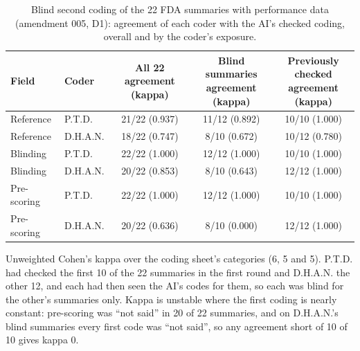 \begin{table}[h!]
\centering
\footnotesize
\caption{Blind second coding of the 22 FDA summaries with performance data (amendment 005, D1): agreement of each coder with the AI's checked coding, overall and by the coder's exposure.}
\label{tab:s-d1}
\begin{adjustbox}{max width=\linewidth}
\begin{tabular}{llccc}
\toprule
Field & Coder & \makecell{All 22\\agreement (kappa)} & \makecell{Blind summaries\\agreement (kappa)} & \makecell{Previously checked\\agreement (kappa)} \\
\midrule
Reference & P.T.D. & 21/22 (0.937) & 11/12 (0.892) & 10/10 (1.000) \\
Reference & D.H.A.N. & 18/22 (0.747) & 8/10 (0.672) & 10/12 (0.780) \\
Blinding & P.T.D. & 22/22 (1.000) & 12/12 (1.000) & 10/10 (1.000) \\
Blinding & D.H.A.N. & 20/22 (0.853) & 8/10 (0.643) & 12/12 (1.000) \\
Pre-scoring & P.T.D. & 22/22 (1.000) & 12/12 (1.000) & 10/10 (1.000) \\
Pre-scoring & D.H.A.N. & 20/22 (0.636) & 8/10 (0.000) & 12/12 (1.000) \\
\bottomrule
\end{tabular}
\end{adjustbox}
\par\smallskip
\begin{minipage}{0.95\linewidth}\footnotesize Unweighted Cohen's kappa over the coding sheet's categories (6, 5 and 5). P.T.D. had checked the first 10 of the 22 summaries in the first round and D.H.A.N. the other 12, and each had then seen the AI's codes for them, so each was blind for the other's summaries only. Kappa is unstable where the first coding is nearly constant: pre-scoring was ``not said'' in 20 of 22 summaries, and on D.H.A.N.'s blind summaries every first code was ``not said'', so any agreement short of 10 of 10 gives kappa 0.\end{minipage}
\end{table}
